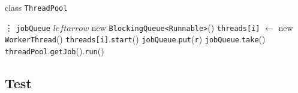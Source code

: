 \documentclass{article}
\begin{document}
\begin{algorithm}
    \caption{class \texttt{ThreadPool}}
	\begin{algorithmic}
            \State \vdots
            \State \texttt{jobQueue} $leftarrow$ new \texttt{BlockingQueue<Runnable>}()
                \State \texttt{threads[i]} $\leftarrow$ new \texttt{WorkerThread}()
                \State \texttt{threads[i]}.\texttt{start}()
            \EndFor
        \EndProcedure
            \State \texttt{jobQueue}.\texttt{put}(\texttt{r})
        \EndProcedure
            \State \Return \texttt{jobQueue}.\texttt{take}()
        \EndProcedure
                \State \texttt{threadPool}.\texttt{getJob}().\texttt{run}()
            \EndWhile
        \EndProcedure
	\end{algorithmic}
\end{algorithm}
\subsection{Test}
\end{document}
